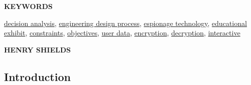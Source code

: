 \documentclass[conference]{IEEEtran}
\begin{document}

\begin{center}
\LARGE \textbf{KEYWORDS}\\
\end{center}
\begin{justify}
  \underline{decision analysis}, \underline{engineering design process}, \underline{espionage technology}, \underline{educational exhibit}, \underline{constraints}, \underline{objectives}, \underline{user data}, \underline{encryption}, \underline{decryption}, \underline{interactive}
\end{justify}

\newpage

\Large

\tableofcontents

\newpage


\Large

\listoftables


\listoffigures

\twocolumn


\newpage


\vspace{10pt} \LARGE \textbf{HENRY SHIELDS} \normalsize

\subsection{Introduction}
\end{document}

